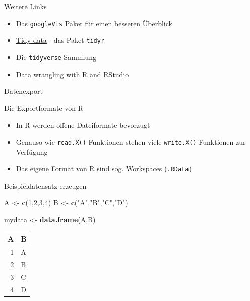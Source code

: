 \documentclass[ignorenonframetext,]{beamer}
\newenvironment{Shaded}{}{}
\newcommand{\KeywordTok}[1]{\textcolor[rgb]{0.00,0.44,0.13}{\textbf{{#1}}}}
\newcommand{\DecValTok}[1]{\textcolor[rgb]{0.25,0.63,0.44}{{#1}}}
\newcommand{\StringTok}[1]{\textcolor[rgb]{0.25,0.44,0.63}{{#1}}}
\newcommand{\NormalTok}[1]{{#1}}
\providecommand{\tightlist}{%
\setlength{\itemsep}{0pt}\setlength{\parskip}{0pt}}
\begin{document}
\begin{frame}[fragile]{Weitere Links}

\begin{itemize}
\item
  \href{https://cran.r-project.org/web/packages/googleVis/vignettes/googleVis_examples.html}{Das
  \texttt{googleVis} Paket für einen besseren Überblick}
\item
  \href{https://cran.r-project.org/web/packages/tidyr/vignettes/tidy-data.html}{Tidy
  data} - das Paket \texttt{tidyr}
\item
  \href{http://tidyverse.org/}{Die \texttt{tidyverse} Sammlung}
\item
  \href{https://www.rstudio.com/resources/webinars/data-wrangling-with-r-and-rstudio/}{Data
  wrangling with R and RStudio}
\end{itemize}

\end{frame}

\begin{frame}{Datenexport}

\end{frame}

\begin{frame}[fragile]{Die Exportformate von R}

\begin{itemize}
\tightlist
\item
  In R werden offene Dateiformate bevorzugt
\item
  Genauso wie \texttt{read.X()} Funktionen stehen viele
  \texttt{write.X()} Funktionen zur Verfügung
\item
  Das eigene Format von R sind sog. Workspaces (\texttt{.RData})
\end{itemize}

\end{frame}

\begin{frame}[fragile]{Beispieldatensatz erzeugen}

\begin{Shaded}
\begin{Highlighting}[]
\NormalTok{A <-}\StringTok{ }\KeywordTok{c}\NormalTok{(}\DecValTok{1}\NormalTok{,}\DecValTok{2}\NormalTok{,}\DecValTok{3}\NormalTok{,}\DecValTok{4}\NormalTok{)}
\NormalTok{B <-}\StringTok{ }\KeywordTok{c}\NormalTok{(}\StringTok{"A"}\NormalTok{,}\StringTok{"B"}\NormalTok{,}\StringTok{"C"}\NormalTok{,}\StringTok{"D"}\NormalTok{)}

\NormalTok{mydata <-}\StringTok{ }\KeywordTok{data.frame}\NormalTok{(A,B)}
\end{Highlighting}
\end{Shaded}

\begin{longtable}[]{@{}rl@{}}
\toprule
A & B\tabularnewline
\midrule
\endhead
1 & A\tabularnewline
2 & B\tabularnewline
3 & C\tabularnewline
4 & D\tabularnewline
\bottomrule
\end{longtable}

\end{frame}
\end{document}
